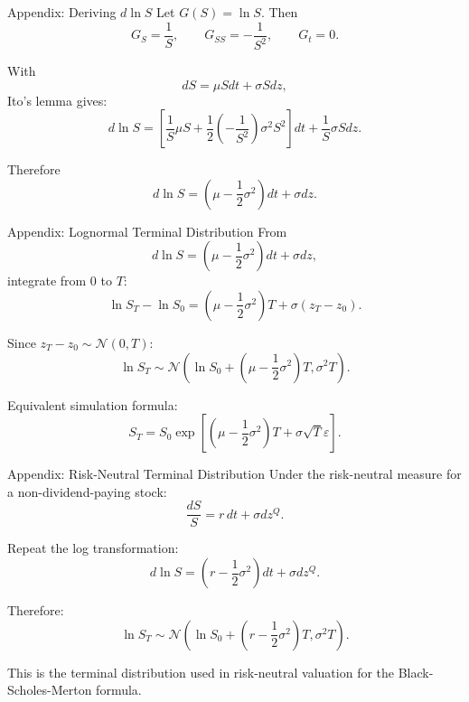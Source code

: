 \documentclass[aspectratio=169,11pt]{beamer}
\newcommand{\eps}{\varepsilon}
\newcommand{\Normal}{\mathcal{N}}
\newcommand{\Ito}{Ito}
\begin{document}
\begin{frame}[label=deriv_log_process]{Appendix: Deriving \(d\ln S\)}
    Let \(G(S)=\ln S\). Then
    \[
        G_S=\frac{1}{S},
        \qquad
        G_{SS}=-\frac{1}{S^2},
        \qquad
        G_t=0.
    \]

    With
    \[
        dS=\mu Sdt+\sigma Sdz,
    \]
    \Ito's lemma gives:
    \[
        d\ln S
        =
        \left[
            \frac{1}{S}\mu S
            +
            \frac{1}{2}\left(-\frac{1}{S^2}\right)\sigma^2S^2
        \right]dt
        +
        \frac{1}{S}\sigma Sdz.
    \]

    Therefore
    \[
        d\ln S
        =
        \left(\mu-\frac{1}{2}\sigma^2\right)dt+\sigma dz.
    \]

    \hyperlink{log_process_main}{}
\end{frame}

\begin{frame}[label=deriv_lognormal]{Appendix: Lognormal Terminal Distribution}
    From
    \[
        d\ln S
        =
        \left(\mu-\frac{1}{2}\sigma^2\right)dt+\sigma dz,
    \]
    integrate from 0 to \(T\):
    \[
        \ln S_T-\ln S_0
        =
        \left(\mu-\frac{1}{2}\sigma^2\right)T
        +
        \sigma(z_T-z_0).
    \]

    Since \(z_T-z_0\sim\Normal(0,T)\):
    \[
        \ln S_T
        \sim
        \Normal\left(
            \ln S_0+\left(\mu-\frac{1}{2}\sigma^2\right)T,
            \sigma^2T
        \right).
    \]

    Equivalent simulation formula:
    \[
        S_T
        =
        S_0
        \exp\left[
            \left(\mu-\frac{1}{2}\sigma^2\right)T
            +
            \sigma\sqrt{T}\eps
        \right].
    \]

    \hyperlink{terminal_distribution_main}{}
    \quad
    \hyperlink{lognormal_sim_main}{}
\end{frame}

\begin{frame}[label=deriv_risk_neutral_distribution]{Appendix: Risk-Neutral Terminal Distribution}
    Under the risk-neutral measure for a non-dividend-paying stock:
    \[
        \frac{dS}{S}=r\,dt+\sigma dz^Q.
    \]

    Repeat the log transformation:
    \[
        d\ln S
        =
        \left(r-\frac{1}{2}\sigma^2\right)dt+\sigma dz^Q.
    \]

    Therefore:
    \[
        \ln S_T
        \sim
        \Normal\left(
            \ln S_0+\left(r-\frac{1}{2}\sigma^2\right)T,
            \sigma^2T
        \right).
    \]

    This is the terminal distribution used in risk-neutral valuation for the Black-Scholes-Merton formula.

    \hyperlink{risk_neutral_preview_main}{}
\end{frame}
\end{document}
